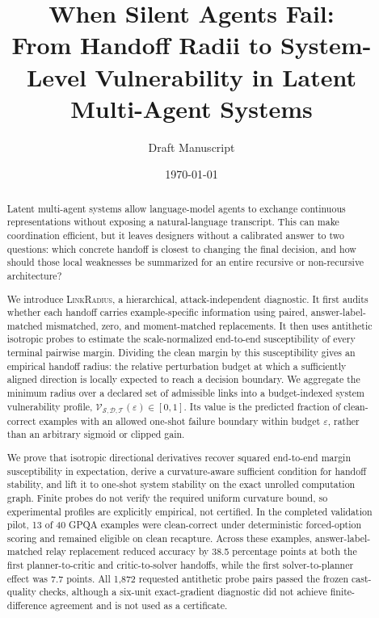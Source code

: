 \documentclass[11pt]{article}
\title{When Silent Agents Fail:\\
From Handoff Radii to System-Level Vulnerability in Latent Multi-Agent Systems}
\author{Draft Manuscript}
\date{\today}
\newcommand{\eps}{\varepsilon}
\newcommand{\method}{\textsc{LinkRadius}}
\newcommand{\Vuln}{\mathcal V}
\newcommand{\sys}{\mathcal S}
\newcommand{\threat}{\mathcal T}
\begin{document}
\maketitle

\begin{abstract}
Latent multi-agent systems allow language-model agents to exchange continuous
representations without exposing a natural-language transcript. This can make
coordination efficient, but it leaves designers without a calibrated answer to
two questions: which concrete handoff is closest to changing the final
decision, and how should those local weaknesses be summarized for an entire
recursive or non-recursive architecture?

We introduce \method{}, a hierarchical, attack-independent diagnostic. It
first audits whether each handoff carries example-specific information using
paired, answer-label-matched mismatched, zero, and moment-matched replacements.
It then uses antithetic isotropic probes to estimate the scale-normalized
end-to-end susceptibility of every terminal pairwise margin. Dividing the
clean margin by this susceptibility gives an empirical handoff radius: the
relative perturbation budget at which a sufficiently aligned direction is
locally expected to reach a decision boundary. We aggregate the minimum radius
over a declared set of admissible links into a budget-indexed system
vulnerability profile, \(\Vuln_{\sys,\mathcal D,\threat}(\eps)\in[0,1]\). Its
value is the predicted fraction of clean-correct examples with an allowed
one-shot failure boundary within budget \(\eps\), rather than an arbitrary
sigmoid or clipped gain.

We prove that isotropic directional derivatives recover squared end-to-end
margin susceptibility in expectation, derive a curvature-aware sufficient
condition for handoff stability, and lift it to one-shot system stability on
the exact unrolled computation graph. Finite probes do not verify the required
uniform curvature bound, so experimental profiles are explicitly empirical,
not certified. In the completed validation pilot, 13 of 40 GPQA examples were
clean-correct under deterministic forced-option scoring and remained eligible
on clean recapture. Across these examples, answer-label-matched relay
replacement reduced accuracy by 38.5 percentage points at both the first
planner-to-critic and critic-to-solver handoffs, while the first
solver-to-planner effect was 7.7 points. All 1,872 requested antithetic probe
pairs passed the frozen cast-quality checks, although a six-unit exact-gradient
diagnostic did not achieve finite-difference agreement and is not used as a
certificate.


\end{abstract}
\end{document}
